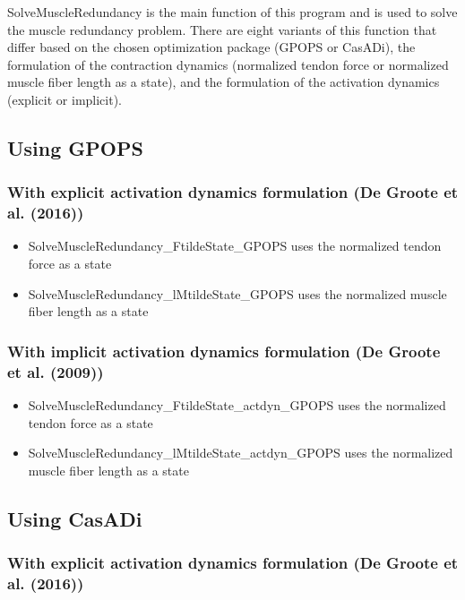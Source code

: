 \documentclass[a4paper,oneside,11pt]{article}
\begin{document}
SolveMuscleRedundancy is the main function of this program and is used to solve the muscle redundancy problem. There are eight variants of this function that differ based on the chosen optimization package (GPOPS or CasADi), the formulation of the contraction dynamics (normalized tendon force or normalized muscle fiber length as a state), and the formulation of the activation dynamics (explicit or implicit).

\subsection{Using GPOPS}

\subsubsection{With explicit activation dynamics formulation (De Groote et al. (2016))}

\begin{itemize}
\item SolveMuscleRedundancy_FtildeState_GPOPS uses the normalized tendon force as a state
\item SolveMuscleRedundancy_lMtildeState_GPOPS uses the normalized muscle fiber length as a state
\end{itemize}

\subsubsection{With implicit activation dynamics formulation (De Groote et al. (2009))}

\begin{itemize}
\item SolveMuscleRedundancy_FtildeState_actdyn_GPOPS uses the normalized tendon force as a state
\item SolveMuscleRedundancy_lMtildeState_actdyn_GPOPS uses the normalized muscle fiber length as a state
\end{itemize}

\subsection{Using CasADi}

\subsubsection{With explicit activation dynamics formulation (De Groote et al. (2016))}
\end{document}
